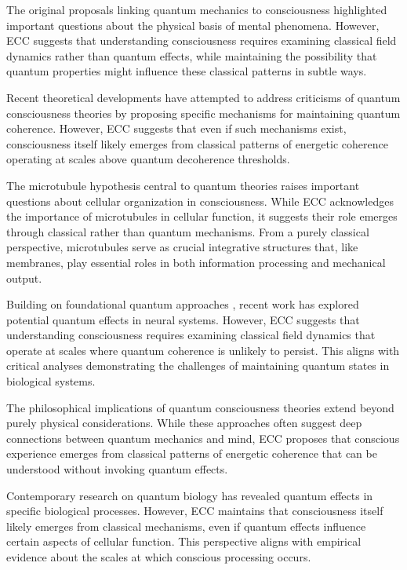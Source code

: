 \begin{refsection}
The original proposals linking quantum mechanics to consciousness \cite{Beck1992} highlighted important questions about the physical basis of mental phenomena. However, ECC suggests that understanding consciousness requires examining classical field dynamics rather than quantum effects, while maintaining the possibility that quantum properties might influence these classical patterns in subtle ways.

Recent theoretical developments \cite{Hameroff2014} have attempted to address criticisms of quantum consciousness theories by proposing specific mechanisms for maintaining quantum coherence. However, ECC suggests that even if such mechanisms exist, consciousness itself likely emerges from classical patterns of energetic coherence operating at scales above quantum decoherence thresholds.

The microtubule hypothesis central to quantum theories \cite{Hameroff2014} raises important questions about cellular organization in consciousness. While ECC acknowledges the importance of microtubules in cellular function, it suggests their role emerges through classical rather than quantum mechanisms. From a purely classical perspective, microtubules serve as crucial integrative structures that, like membranes, play essential roles in both information processing and mechanical output.

Building on foundational quantum approaches \cite{Penrose1989}, recent work has explored potential quantum effects in neural systems. However, ECC suggests that understanding consciousness requires examining classical field dynamics that operate at scales where quantum coherence is unlikely to persist. This aligns with critical analyses \cite{Tegmark2000} demonstrating the challenges of maintaining quantum states in biological systems.

The philosophical implications of quantum consciousness theories \cite{Bohm1990} extend beyond purely physical considerations. While these approaches often suggest deep connections between quantum mechanics and mind, ECC proposes that conscious experience emerges from classical patterns of energetic coherence that can be understood without invoking quantum effects.

Contemporary research on quantum biology \cite{Koch2006} has revealed quantum effects in specific biological processes. However, ECC maintains that consciousness itself likely emerges from classical mechanisms, even if quantum effects influence certain aspects of cellular function. This perspective aligns with empirical evidence about the scales at which conscious processing occurs.


\end{refsection}
